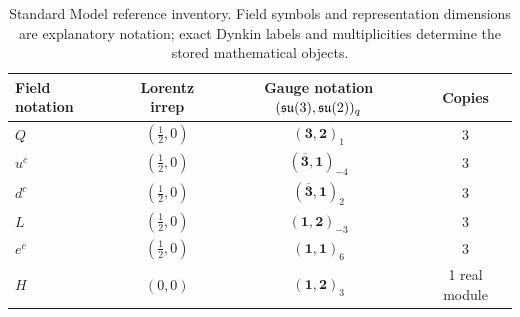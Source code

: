 \begin{table}[htb]
\centering
\begin{tabular}{lccc}
\toprule
Field notation & Lorentz irrep & Gauge notation $(\mathfrak{su}(3),\mathfrak{su}(2))_q$ & Copies \\
\midrule
$Q$ & $(\tfrac12,0)$ & $(\mathbf3,\mathbf2)_{1}$ & 3 \\
$u^c$ & $(\tfrac12,0)$ & $(\overline{\mathbf3},\mathbf1)_{-4}$ & 3 \\
$d^c$ & $(\tfrac12,0)$ & $(\overline{\mathbf3},\mathbf1)_{2}$ & 3 \\
$L$ & $(\tfrac12,0)$ & $(\mathbf1,\mathbf2)_{-3}$ & 3 \\
$e^c$ & $(\tfrac12,0)$ & $(\mathbf1,\mathbf1)_{6}$ & 3 \\
$H$ & $(0,0)$ & $(\mathbf1,\mathbf2)_{3}$ & 1 real module \\
\bottomrule
\end{tabular}
\caption{Standard Model reference inventory. Field symbols and representation dimensions are explanatory notation; exact Dynkin labels and multiplicities determine the stored mathematical objects.}
\label{tab:sm}
\end{table}

